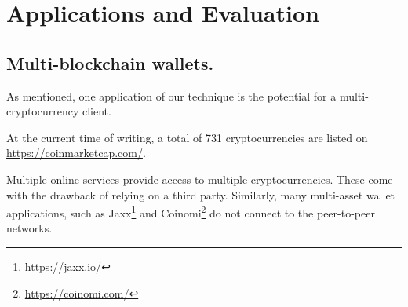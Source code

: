 \section{Applications and Evaluation}




\subsection{Multi-blockchain wallets.}
As mentioned, one application of our technique is the potential for a multi-cryptocurrency client.

At the current time of writing, a total of 731 cryptocurrencies are listed on 
\url{https://coinmarketcap.com/}.


Multiple online services provide access to multiple cryptocurrencies. These come with the drawback of relying on a third party.
Similarly, many multi-asset wallet applications, such as Jaxx\footnote{\url{https://jaxx.io/}} and Coinomi\footnote{\url{https://coinomi.com/}} do not connect to the peer-to-peer networks.

